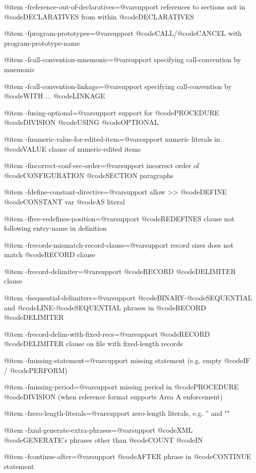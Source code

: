 @item -freference-out-of-declaratives=@var{support}
references to sections not in @code{DECLARATIVES} from within @code{DECLARATIVES}

@item -fprogram-prototypes=@var{support}
@code{CALL}/@code{CANCEL} with program-prototype-name

@item -fcall-convention-mnemonic=@var{support}
specifying call-convention by mnemonic

@item -fcall-convention-linkage=@var{support}
specifying call-convention by @code{WITH} ... @code{LINKAGE}

@item -fusing-optional=@var{support}
support for @code{PROCEDURE} @code{DIVISION} @code{USING} @code{OPTIONAL}

@item -fnumeric-value-for-edited-item=@var{support}
numeric literals in @code{VALUE} clause of numeric-edited items

@item -fincorrect-conf-sec-order=@var{support}
incorrect order of @code{CONFIGURATION} @code{SECTION} paragraphs

@item -fdefine-constant-directive=@var{support}
allow >> @code{DEFINE} @code{CONSTANT} var @code{AS} literal

@item -ffree-redefines-position=@var{support}
@code{REDEFINES} clause not following entry-name in definition

@item -frecords-mismatch-record-clause=@var{support}
record sizes does not match @code{RECORD} clause

@item -frecord-delimiter=@var{support}
@code{RECORD} @code{DELIMITER} clause

@item -fsequential-delimiters=@var{support}
@code{BINARY}-@code{SEQUENTIAL} and @code{LINE}-@code{SEQUENTIAL} phrases in @code{RECORD} @code{DELIMITER}

@item -frecord-delim-with-fixed-recs=@var{support}
@code{RECORD} @code{DELIMITER} clause on file with fixed-length records

@item -fmissing-statement=@var{support}
missing statement (e.g. empty @code{IF} / @code{PERFORM})

@item -fmissing-period=@var{support}
missing period in @code{PROCEDURE} @code{DIVISION} (when reference format supports Area A enforcement)

@item -fzero-length-literals=@var{support}
zero-length literals, e.g. '' and ""

@item -fxml-generate-extra-phrases=@var{support}
@code{XML} @code{GENERATE'}s phrases other than @code{COUNT} @code{IN}

@item -fcontinue-after=@var{support}
@code{AFTER} phrase in @code{CONTINUE} statement

